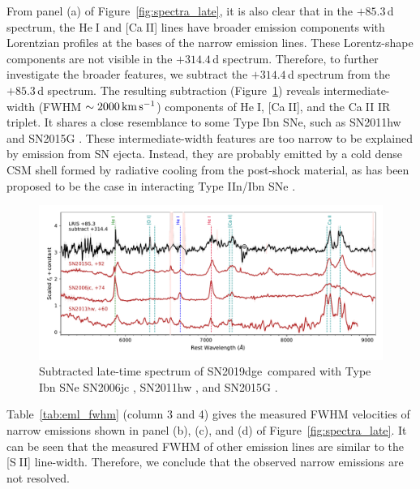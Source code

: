 \documentclass[twocolumn]{aastex63}
\newcommand{\name}{SN2019dge}
\def\ion#1#2{#1$\;${\footnotesize\rm{#2}}\relax}
\begin{document}
From panel (a) of Figure~\ref{fig:spectra_late}, it is also clear that in the $+85.3$\,d spectrum, the 
\ion{He}{I} and [\ion{Ca}{II}] lines have broader emission components with Lorentzian profiles at the 
bases of the narrow emission lines. These Lorentz-shape components are not visible in the 
$+314.4$\,d spectrum. Therefore, to further investigate the broader features, we subtract the 
$+314.4$\,d spectrum from the $+85.3$\,d spectrum. The resulting subtraction 
(Figure~\ref{fig:spec_subtract}) reveals intermediate-width (FWHM $\sim 2000\,{\rm km\,s^{-1}}$) 
components of \ion{He}{I}, [\ion{Ca}{II}], and the \ion{Ca}{II} IR triplet. It shares a close resemblance to 
some Type Ibn SNe, such as SN2011hw \citep{Pastorello2015} and SN2015G \citep{Shivvers2017}. 
These intermediate-width features are too narrow to be explained by emission from
SN ejecta. Instead, they are probably emitted by a cold dense CSM 
shell formed by radiative cooling from the post-shock material, as has been proposed to be the case in 
interacting Type IIn/Ibn SNe \citep{Chugai1994, Smith2017}. 

\begin{figure}
	\centering
	\includegraphics[width=\textwidth]{figures/spec_host_subtracted.pdf}
	\caption{Subtracted late-time spectrum of \name\ compared with Type Ibn SNe SN2006jc 
		\citep{Shivvers2019}, 
		SN2011hw \citep{Pastorello2015}, and SN2015G \citep{Shivvers2017}.
		\label{fig:spec_subtract}}
\end{figure}

Table~\ref{tab:eml_fwhm} (column 3 and 4) gives the measured FWHM velocities of narrow emissions 
shown in panel (b), (c), and (d) of Figure~\ref{fig:spectra_late}. It can 
be seen that the measured FWHM of other emission lines are similar to the [\ion{S}{II}] line-width. 
Therefore, we conclude that the observed narrow emissions are not resolved.
\end{document}
